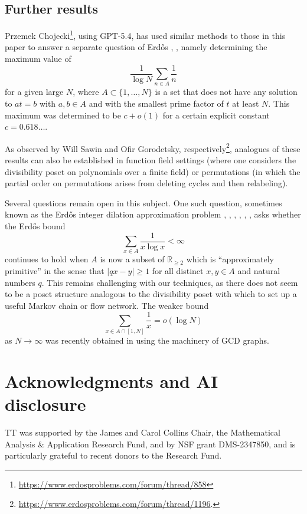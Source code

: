\documentclass[12pt]{amsart}
\theoremstyle{definition}
\theoremstyle{remark}
\numberwithin{equation}{section}
\newcommand{\R}{{\mathbb R}}
\newcommand{\1}{{\mathbf 1}}
\newcommand{\Erdos}{{Erd\H{o}s}}
\begin{document}
\subsection{Further results} \label{subsection:further}

Przemek Chojecki\footnote{\url{https://www.erdosproblems.com/forum/thread/858}}, using GPT-5.4, has used similar methods to those in this paper to answer a separate question of \Erdos{} \cite[p.~128]{erdos70}, \cite[Problem \#858]{bloom}, namely determining the maximum value of
$$ \frac{1}{\log N} \sum_{n \in A} \frac{1}{n}$$
for a given large $N$, where $A \subset \{1,\dots,N\}$ is a set that does not have any solution to $at=b$ with $a,b \in A$ and with the smallest prime factor of $t$ at least $N$.  This maximum was determined to be $c+o(1)$ for a certain explicit constant $c = 0.618\dots$.

As observed by Will Sawin and Ofir Gorodetsky, respectively\footnote{\url{https://www.erdosproblems.com/forum/thread/1196}.}, analogues of these results can also be established in function field settings (where one considers the divisibility poset on polynomials over a finite field) or permutations (in which the partial order on permutations arises from deleting cycles and then relabeling).  

Several questions remain open in this subject. One such question, sometimes known as the \Erdos{} integer dilation approximation problem \cite{erdos61}, \cite{erdos73}, \cite{erdos77}, \cite[p.~101]{erdos-survey}, \cite{erdos92}, \cite{erdos97}, \cite[Problem \#143]{bloom} asks whether the \Erdos{} bound
$$ \sum_{x \in A} \frac{1}{x \log x} < \infty$$
continues to hold when $A$ is now a subset of $\R_{\ge2}$ which is ``approximately primitive'' in the sense that $|qx-y| \geq 1$ for all distinct $x,y \in A$ and natural numbers $q$.  This remains challenging with our techniques, as there does not seem to be a poset structure analogous to the divisibility poset with which to set up a useful Markov chain or flow network.  The weaker bound
$$ \sum_{x \in A \cap [1,N]} \frac{1}{x} = o(\log N)$$
as $N \to \infty$ was recently obtained in \cite{KKL} using the machinery of GCD graphs.


\section{Acknowledgments and AI disclosure}\label{acknowledgments-sec}

TT was supported by the James and Carol Collins Chair, the Mathematical Analysis \& Application Research Fund, and by NSF grant DMS-2347850, and is particularly grateful to recent donors to the Research Fund. 
\end{document}
